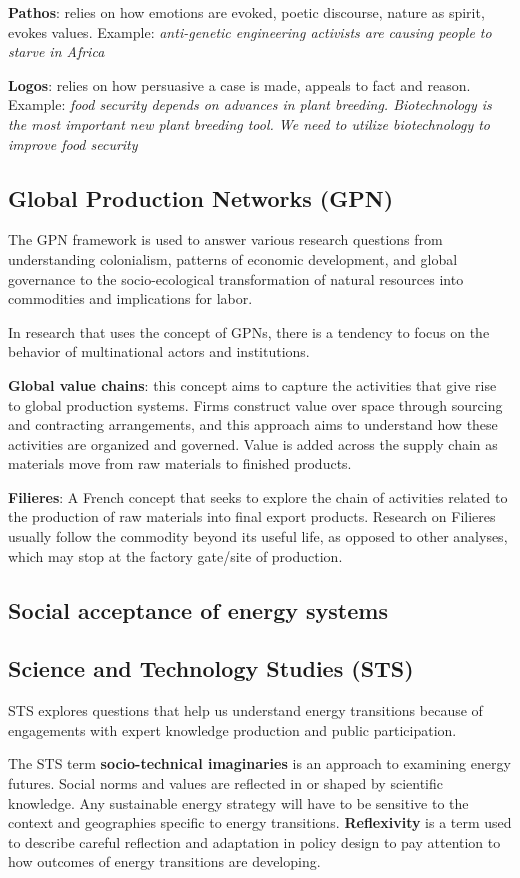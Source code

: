 \textbf{Pathos}: relies on how emotions are evoked, poetic discourse, nature as
spirit, evokes values. Example: \textit{anti-genetic engineering activists are
causing people to starve in Africa}

\textbf{Logos}: relies on how persuasive a case is made, appeals to fact and
reason. Example: \textit{food security depends on advances in plant breeding.
Biotechnology is the most important new plant breeding tool. We need to
utilize biotechnology to improve food security}

\subsection{Global Production Networks (GPN)}

The GPN framework is used to answer various research questions from
understanding colonialism, patterns of economic development, and global
governance to the socio-ecological transformation of natural resources into
commodities and implications for labor.

In research that uses the concept of GPNs, there is a tendency to focus on the
behavior of multinational actors and institutions.

\textbf{Global value chains}: this concept aims to capture the activities that
give rise to global production systems. Firms construct value over space
through sourcing and contracting arrangements, and this approach aims to
understand how these activities are organized and governed. Value is added
across the supply chain as materials move from raw materials to finished
products.

\textbf{Filieres}: A French concept that seeks to explore the chain of
activities related to the production of raw materials into final export
products. Research on Filieres usually follow the commodity beyond its useful
life, as opposed to other analyses, which may stop at the factory gate/site
of production.

\subsection{Social acceptance of energy systems}

\subsection{Science and Technology Studies (STS)}

STS explores questions that help us understand energy transitions because of
engagements with expert knowledge production and public participation.

The STS term \textbf{socio-technical imaginaries} is an approach to examining
energy futures. Social norms and values are reflected in or shaped by
scientific knowledge. Any sustainable energy strategy will have to be sensitive
to the context and geographies specific to energy transitions.
\textbf{Reflexivity} is a term used to describe careful reflection and
adaptation in policy design to pay attention to how outcomes of energy
transitions are developing.
